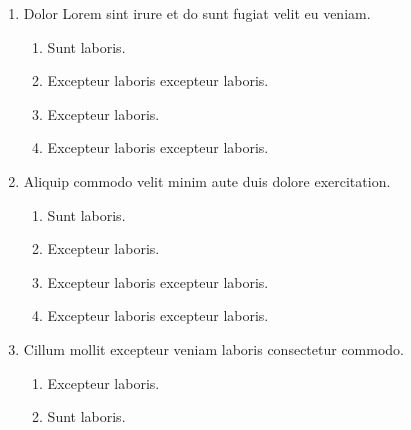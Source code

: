 \documentclass[a4paper,12pt]{article}
\begin{document}
\begin{enumerate}[label=\textbf{\arabic*.}]
\begin{multicols}{2}
\begin{enumerate}
		\item  Excepteur laboris excepteur laboris.
  
		\item  Excepteur laboris excepteur laboris.
    
		\item  Excepteur laboris.
    
	\end{enumerate}

\end{multicols}
\item Dolor Lorem sint irure et do sunt fugiat velit eu veniam.
\begin{multicols}{2}
	\begin{enumerate}
		\item  Sunt laboris.
    
		\item  Excepteur laboris excepteur laboris.
  
		\item  Excepteur laboris.
    
		\item  Excepteur laboris excepteur laboris.
    
	\end{enumerate}

\end{multicols}
\item Aliquip commodo velit minim aute duis dolore exercitation.
\begin{multicols}{2}
	\begin{enumerate}
		\item  Sunt laboris.
    
		\item  Excepteur laboris.
    
		\item  Excepteur laboris excepteur laboris.
    
		\item  Excepteur laboris excepteur laboris.
  
	\end{enumerate}

\end{multicols}
\item Cillum mollit excepteur veniam laboris consectetur commodo.
\begin{multicols}{2}
	\begin{enumerate}
		\item  Excepteur laboris.
    
		\item  Sunt laboris.
    

\end{enumerate}
\end{multicols}
\end{enumerate}
\end{document}
